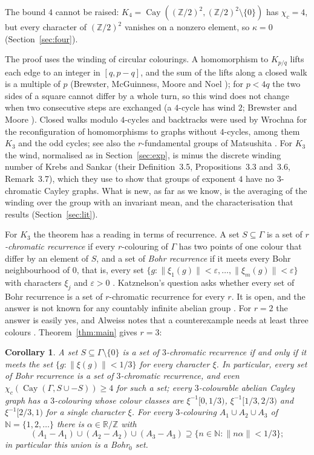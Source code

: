 \documentclass[11pt,a4paper]{amsart}
\newtheorem{corollary}[theorem]{Corollary}
\theoremstyle{definition}
\newcommand{\R}{\mathbb{R}}
\newcommand{\Z}{\mathbb{Z}}
\newcommand{\Cay}{\operatorname{Cay}}
\newcommand{\RZ}{\R/\Z}
\begin{document}
The bound $4$ cannot be raised: $K_4=\Cay((\Z/2)^2,(\Z/2)^2\setminus\{0\})$ has $\chi_c=4$, but every character
of $(\Z/2)^2$ vanishes on a nonzero element, so $\kappa=0$ (Section~\ref{sec:four}).

The proof uses the winding of circular colourings. A homomorphism to $K_{p/q}$ lifts each edge to an integer in
$[q,p-q]$, and the sum of the lifts along a closed walk is a multiple of $p$ (Brewster, McGuinness, Moore and Noel
\cite[\S2.1]{BMMN}); for $p<4q$ the two sides of a square cannot differ by a whole turn, so this wind does not
change when two consecutive steps are exchanged (a $4$-cycle has wind $2$; Brewster and Moore \cite[\S2]{BM}).
Closed walks modulo $4$-cycles and backtracks were used by Wrochna \cite{Wrochna} for the reconfiguration of
homomorphisms to graphs without $4$-cycles, among them $K_3$ and the odd cycles; see also the $r$-fundamental groups of
Matsushita \cite{Matsushita}. For $K_3$ the wind, normalised as in Section~\ref{sec:exp}, is minus the discrete
winding number of Krebs and Sankar \cite{KS} (their Definition~3.5, Propositions~3.3 and~3.6, Remark~3.7), which they use to show that groups of
exponent $4$ have no $3$-chromatic Cayley graphs. What is new, as far as we know, is the averaging of the winding
over the group with an invariant mean, and the characterisation that results (Section~\ref{sec:lit}).

For $K_3$ the theorem has a reading in terms of recurrence. A set $S\subseteq\Gamma$ is a set of
\emph{$r$-chromatic recurrence} if every $r$-colouring of $\Gamma$ has two points of one colour that differ by an
element of $S$, and a set of \emph{Bohr recurrence} if it meets every Bohr neighbourhood of $0$, that is, every set
$\{g:\|\xi_1(g)\|<\varepsilon,\dots,\|\xi_m(g)\|<\varepsilon\}$ with characters $\xi_j$ and $\varepsilon>0$
\cite[Definitions~1.1 and~1.2]{Griesmer}. Katznelson's
question \cite{Katznelson,GKR,Griesmer} asks whether every set of Bohr recurrence is a set of $r$-chromatic
recurrence for every $r$. It is open, and the answer is not known for any countably infinite abelian group
\cite{Griesmer}. For $r=2$ the answer is easily yes, and Alweiss notes that a counterexample needs at least three
colours \cite[\S3]{Alweiss}. Theorem~\ref{thm:main} gives $r=3$:

\begin{corollary}\label{cor:bohr}
A set $S\subseteq\Gamma\setminus\{0\}$ is a set of $3$-chromatic recurrence if and only if it meets the set
$\{g:\|\xi(g)\|<1/3\}$ for every character $\xi$. In particular, every set of Bohr recurrence is a set of
$3$-chromatic recurrence, and even $\chi_c(\Cay(\Gamma,S\cup-S))\ge4$ for such a set; every $3$-colourable abelian
Cayley graph has a $3$-colouring whose colour classes are
$\xi^{-1}[0,1/3)$, $\xi^{-1}[1/3,2/3)$ and $\xi^{-1}[2/3,1)$ for a single character $\xi$. For every $3$-colouring
$A_1\cup A_2\cup A_3$ of $\mathbb N=\{1,2,\dots\}$ there is $\alpha\in\RZ$ with
\[
(A_1-A_1)\cup(A_2-A_2)\cup(A_3-A_3)\supseteq\{n\in\mathbb N:\|n\alpha\|<1/3\};
\]
in particular this union is a Bohr$_0$ set.
\end{corollary}
\end{document}
